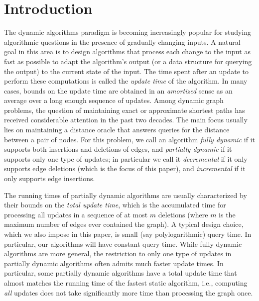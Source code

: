 \documentclass[11pt]{article}
\theoremstyle{definition}
\theoremstyle{remark}
\begin{document}
\section{Introduction}
The dynamic algorithms paradigm is becoming increasingly popular for studying algorithmic questions in the presence of gradually changing inputs.
A natural goal in this area is to design algorithms that process each change to the input as fast as possible to adapt the algorithm's output (or a data structure for querying the output) to the current state of the input.
The time spent after an update to perform these computations is called the \emph{update time} of the algorithm.
In many cases, bounds on the update time are obtained in an \emph{amortized} sense as an average over a long enough sequence of updates. Among dynamic graph problems, the question of maintaining exact or approximate shortest paths has received considerable attention in the past two decades. The main focus usually lies on maintaining a distance oracle that answers queries for the distance between a pair of nodes.
For this problem, we call an algorithm \emph{fully dynamic} if it supports both insertions and deletions of edges, and \emph{partially dynamic} if it supports only one type of updates; in particular we call it \emph{decremental} if it only supports edge deletions  (which is the focus of this paper), and \emph{incremental} if it only supports edge insertions. 

The running times of partially dynamic algorithms are usually characterized by their bounds on the \emph{total update time}, which is the accumulated time for processing all updates in a sequence of at most $ m $ deletions (where $ m $ is the maximum number of edges ever contained the graph).
A typical design choice, which we also impose in this paper, is small (say polylogarithmic) query time. In particular, our algorithms will have constant query time.
While fully dynamic algorithms are more general, the restriction to only one type of updates in partially dynamic algorithms often admits much faster update times.
In particular, some partially dynamic algorithms have a total update time that almost matches the running time of the fastest static algorithm, i.e., computing \emph{all} updates does not take significantly more time than processing the graph once.
\end{document}
